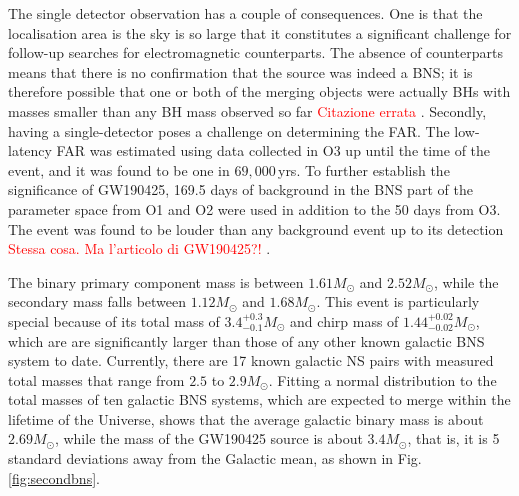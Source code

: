 \documentclass[binding=0.6cm, LaM]{sapthesis}
\newcommand{\fpg}[1]{\textcolor{red}{#1} }
\begin{document}
	The single detector observation has a couple of consequences. 
	One is that the localisation area is the sky is so large
	that it constitutes a significant challenge for follow-up searches for electromagnetic counterparts. 
	The absence of counterparts means that there is no confirmation that the source was indeed a BNS; 
	it is therefore possible that one or both of the merging objects were actually 
	BHs with masses smaller than any BH mass observed so far \cite{28} \fpg{Citazione errata}.
	Secondly, having a single-detector poses a challenge on determining the FAR.
	The low-latency FAR was estimated using data collected in O3 
	up until the time of the event, and it was found to be one in $69,000\,$yrs. 
	To further establish the significance of GW190425, 169.5 
	days of background in the BNS part of the parameter space from O1 and O2 were used in addition to the 50 days  
	from O3.  The event was found to be 
	louder than any background event up to its detection \cite{28}\fpg{Stessa cosa.  Ma l'articolo di GW190425?!}.

	The binary primary component mass is between $1.61M_\odot$ and $2.52 M_\odot$, 
	while the secondary mass falls between $1.12M_\odot$ and $1.68 M_\odot$.
	This event is particularly special because of its total mass of $3.4^{+0.3}_{-0.1} M_\odot$ 
	and chirp mass of $1.44^{+0.02}_{-0.02}M_\odot$, which are are significantly larger 
	than those of any other known galactic BNS system to date. 
	Currently, there are 17 known galactic NS pairs with measured total masses 
	that range from $2.5$ to $2.9M_\odot$.
	Fitting a normal distribution to the total masses of ten galactic BNS systems, 
	which are expected to merge within the lifetime of the Universe, 
	shows that the average galactic binary mass is about $2.69M_\odot$, 
	while the mass of the GW190425 source is about $3.4M_\odot$, that is,
	it is 5 standard deviations away from the Galactic mean, as shown in Fig.\,\ref{fig:secondbns}.
\end{document}
